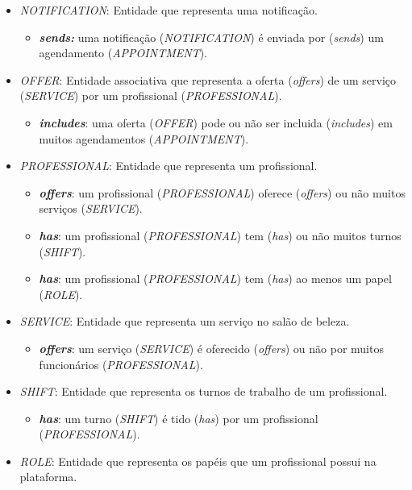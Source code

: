 \begin{itemize}
\begin{itemize}
	\end{itemize}
	\item \emph{NOTIFICATION}: Entidade que representa uma notificação.
	\begin{itemize}
		\item \textbf{\textit{sends:}} uma notificação (\emph{NOTIFICATION}) é enviada por (\textit{sends}) um agendamento (\emph{APPOINTMENT}).
	\end{itemize}
	\item \emph{OFFER}: Entidade associativa que representa a oferta (\textit{offers}) de um serviço (\emph{SERVICE}) por um profissional (\emph{PROFESSIONAL}).
	\begin{itemize}
		\item \textbf{\textit{includes}}: uma oferta (\emph{OFFER}) pode ou não ser incluida (\textit{includes}) em muitos agendamentos (\emph{APPOINTMENT}). 
	\end{itemize}
	\item \emph{PROFESSIONAL}: Entidade que representa um profissional.
	\begin{itemize}
		\item \textbf{\textit{offers}}: um profissional (\emph{PROFESSIONAL}) oferece (\textit{offers}) ou não muitos serviços (\emph{SERVICE}).
		\item \textbf{\textit{has}}: um profissional (\emph{PROFESSIONAL}) tem (\textit{has}) ou não muitos turnos (\emph{SHIFT}).
		\item \textbf{\textit{has}}: um profissional (\emph{PROFESSIONAL}) tem (\textit{has}) ao menos um papel (\emph{ROLE}).
	\end{itemize}
	\item \emph{SERVICE}: Entidade que representa um serviço no salão de beleza.
	\begin{itemize}
		\item \textbf{\textit{offers}}: um serviço (\emph{SERVICE}) é oferecido (\textit{offers}) ou não por muitos funcionários (\emph{PROFESSIONAL}).
	\end{itemize}
	\item \emph{SHIFT}: Entidade que representa os turnos de trabalho de um profissional.
	\begin{itemize}
		\item \textbf{\textit{has}}: um turno (\emph{SHIFT}) é tido (\textit{has}) por um profissional (\emph{PROFESSIONAL}).
	\end{itemize}
	\item \emph{ROLE}: Entidade que representa os papéis que um profissional possui na plataforma.

\end{itemize}
